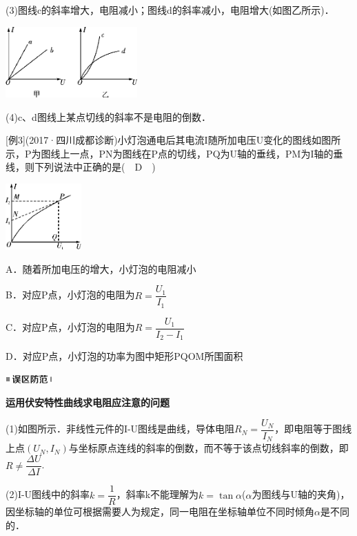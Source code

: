 \documentclass[cn,10.5pt,chinese,mac,chinesefont=founder]{elegantbook}
\begin{document}
(3)图线c的斜率增大，电阻减小；图线d的斜率减小，电阻增大(如图乙所示)．

\begin{center}\includegraphics[width=1.99028in,height=1.06597in]{media/image311.png}\end{center}

(4)c、d图线上某点切线的斜率不是电阻的倒数．

{[}例3{]}(2017·四川成都诊断)小灯泡通电后其电流I随所加电压U变化的图线如图所示，P为图线上一点，PN为图线在P点的切线，PQ为U轴的垂线，PM为I轴的垂线，则下列说法中正确的是(　D　)

\begin{center}\includegraphics[width=1.14167in,height=0.99028in]{media/image312.png}\end{center}

A．随着所加电压的增大，小灯泡的电阻减小

B．对应P点，小灯泡的电阻为$R=\dfrac{U_{1}}{I_{1}}$

C．对应P点，小灯泡的电阻为$R=\dfrac{U_{1}}{I_{2}-I_{1}}$

D．对应P点，小灯泡的功率为图中矩形PQOM所围面积

\begin{center}\includegraphics[width=0.70764in,height=0.12292in]{media/image34.png}\end{center}
\begin{center}
	\textbf{运用伏安特性曲线求电阻应注意的问题}
\end{center}

(1)如图所示．非线性元件的I-U图线是曲线，导体电阻$R_{N}=\dfrac{U_{N}}{I_{N}}$，即电阻等于图线上点$\left(U_{N}, I_{N}\right)$与坐标原点连线的斜率的倒数，而不等于该点切线斜率的倒数，即$R \neq \dfrac{\Delta U}{\Delta I}$.

(2)I-U图线中的斜率$k=\dfrac{1}{R}$，斜率k不能理解为$k=\tan \alpha$($\alpha$为图线与U轴的夹角)，因坐标轴的单位可根据需要人为规定，同一电阻在坐标轴单位不同时倾角$\alpha$是不同的．
\end{document}

